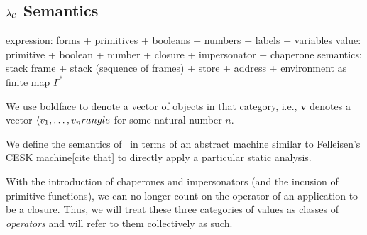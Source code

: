 \documentclass{sigplanconf}
\begin{document}
\newcommand{\chak}[1]{\mathrm{chap}_\kappa(\ell,#1)}
\newcommand{\chacwk}[2]{\mathrm{chap\mhyphen neg\mhyphen ults}_\kappa(\ell,#1,#2)}
\newcommand{\chacfk}[1]{\mathrm{chap\mhyphen fun\mhyphen ults}_\kappa(\ell,#1)}
\newcommand{\chacrk}[1]{\mathrm{chap\mhyphen pos\mhyphen ults}_\kappa(\ell,#1)}

\newcommand{\impk}[1]{\mathrm{imp}_\kappa(\ell,#1)}
\newcommand{\impcwk}[2]{\mathrm{imp\mhyphen neg\mhyphen ults}_\kappa(\ell,#1,#2)}
\newcommand{\impcfk}[1]{\mathrm{imp\mhyphen fun\mhyphen ults}_\kappa(\ell,#1)}
\newcommand{\impcrk}[1]{\mathrm{imp\mhyphen pos\mhyphen ults}_\kappa(\ell,#1)}


\newcommand{\letk}[3]{\mathrm{let}_\kappa(#1,#2,#3)}
\newcommand{\letreck}[3]{\mathrm{letrec}_\kappa(#1,#2,#3)}


\newcommand{\rr}{\longrightarrow}
\newcommand{\rrs}{\longrightarrow^{*}}

\subsection{$\lambda_{\mathcal{C}}$ Semantics}

expression: forms + primitives + booleans + numbers + labels + variables
value: primitive + boolean + number + closure + impersonator + chaperone
semantics: stack frame + stack (sequence of frames) + store + address + environment as finite map
$\Gamma^{*}$

We use boldface to denote a vector of objects in that category, i.e., $\mathbf{v}$ denotes a vector $\langle v_1,\dots,v_n\\rangle$ for some natural number $n$.

We define the semantics of \chapcalc\ in terms of an abstract machine similar to Felleisen's CESK machine[cite that] to directly apply a particular static analysis.

With the introduction of chaperones and impersonators (and the incusion of primitive functions), we can no longer count on the operator of an application to be a closure.
Thus, we will treat these three categories of values as classes of \emph{operators} and will refer to them collectively as such.
\end{document}
